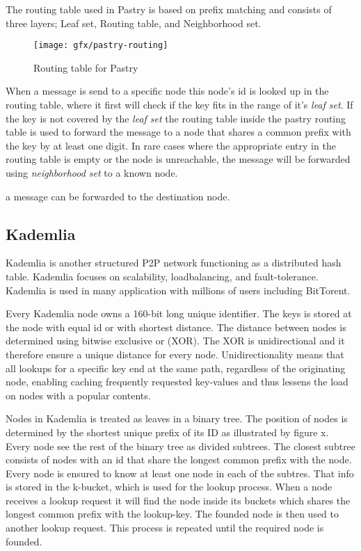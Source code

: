 The routing table used in Pastry is based on prefix matching and consists of three layers; Leaf set, Routing table, and Neighborhood set.
\begin{figure}[bth]
\texttt{[image: gfx/pastry-routing]}
\caption[routingtable]{Routing table for Pastry} \label{fig:pastryrouting}
\end{figure}

When a message is send to a specific node this node's id is looked up in the routing table, where it first will check if the key fits in the range of it's \emph{leaf set}. If the key is not covered by the \emph{leaf set} the routing table inside the pastry routing table is used to forward the message to a node that shares a common prefix with the key by at least one digit.
In rare cases where the appropriate entry in the routing table is empty or the node is unreachable, the message will be forwarded using \emph{neighborhood set} to a known node.


a message can be forwarded to the destination node.


\subsection{Kademlia}
Kademlia is another structured P2P network functioning as a distributed hash table. Kademlia focuses on scalability, loadbalancing, and fault-tolerance. Kademlia is used in many application with millions of users including BitTorent.

Every Kademlia node owns a 160-bit long unique identifier. The keys is stored at the node with equal id or with shortest distance.
The distance between nodes is determined using bitwise exclusive or (XOR). The XOR is unidirectional and it therefore ensure a unique distance for every node. Unidirectionality means that all lookups for a specific key end at the same path, regardless of the originating node, enabling caching frequently requested key-values and thus lessens the load on nodes with a popular contents.

Nodes in Kademlia is treated as leaves in a binary tree. The position of nodes is determined by the shortest unique prefix of its ID as illustrated by figure x. Every node see the rest of the binary tree as divided subtrees. The closest subtree consists of nodes with an id that share the longest common prefix with the node. Every node is ensured to know at least one node in each of the subtres. That info is stored in the k-bucket, which is used for the lookup process. When a node receives a lookup request it will find the node inside its buckets which shares the longest common prefix with the lookup-key. The founded node is then used to another lookup request. This process is repeated until the required node is founded.

